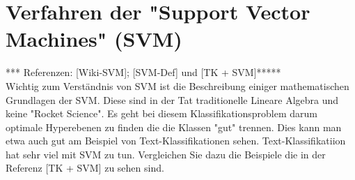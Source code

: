 \documentclass[12pt]{article}
\begin{document}
\newpage

\section{Verfahren der "Support Vector Machines" (SVM)\\}

*** Referenzen: [Wiki-SVM]; [SVM-Def] und  [TK + SVM]*****\\

Wichtig zum Verständnis von SVM ist die Beschreibung einiger mathematischen Grundlagen
der SVM. Diese sind in der Tat traditionelle Lineare Algebra und keine "Rocket Science". Es geht bei diesem Klassifikationsproblem darum optimale Hyperebenen zu finden die die Klassen "gut" trennen.
Dies kann man etwa auch gut am Beispiel von Text-Klassifikationen sehen. Text-Klassifikatiion hat sehr viel mit SVM zu tun. Vergleichen Sie dazu die Beispiele die in der Referenz [TK + SVM] zu sehen sind.
\end{document}
